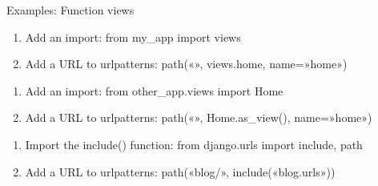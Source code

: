 \documentclass[letterpaper,10pt,polish]{sphinxmanual}
\begin{document}
\sphinxAtStartPar
Examples:
Function views
\begin{enumerate}
%
\item {} 
\sphinxAtStartPar
Add an import:  from my\_app import views

\item {} 
\sphinxAtStartPar
Add a URL to urlpatterns:  path(«», views.home, name=»home»)

\end{enumerate}
\begin{description}
\begin{enumerate}
%
\item {} 
\sphinxAtStartPar
Add an import:  from other\_app.views import Home

\item {} 
\sphinxAtStartPar
Add a URL to urlpatterns:  path(«», Home.as\_view(), name=»home»)

\end{enumerate}

\begin{enumerate}
%
\item {} 
\sphinxAtStartPar
Import the include() function: from django.urls import include, path

\item {} 
\sphinxAtStartPar
Add a URL to urlpatterns:  path(«blog/», include(«blog.urls»))

\end{enumerate}

\end{description}
\end{document}
